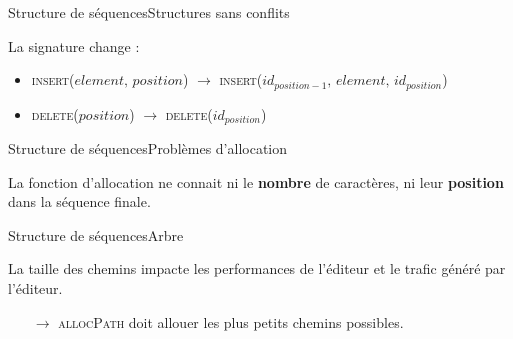 \begin{frame}{Structure de séquences}{Structures sans conflits}
  
  La signature change : 
  \begin{itemize}
  \item \textsc{insert}($element,\, position$) $\rightarrow$
    \textsc{insert}($id_{position-1},\, element,\, id_{position}$)
  \item \textsc{delete}($position$) $\rightarrow$ \textsc{delete}($id_{position}$)
  \end{itemize}

  \vspace{0.5cm}
  

  \begin{algorithm}[H]
    
  \end{algorithm}

\end{frame}


\begin{frame}{Structure de séquences}{Problèmes d'allocation}

  La fonction d'allocation ne connait ni le \textbf{nombre} de caractères, ni
  leur \textbf{position} dans la séquence finale.

  \vspace{0.5cm}

  \begin{center}
    
  \end{center}

\end{frame}


\begin{frame}{Structure de séquences}{Arbre}
  
  \begin{center}
    
  \end{center}
  
  \vspace{0.5cm}
  
  La taille des chemins impacte les performances de l'éditeur et le trafic
  généré par l'éditeur.
  \begin{itemize}
  \item [$\rightarrow$] \textsc{allocPath} doit allouer les plus petits chemins
    possibles.
  \end{itemize}

\end{frame}


